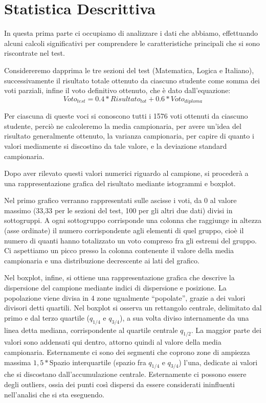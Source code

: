 \section{Statistica Descrittiva}

In questa prima parte ci occupiamo di analizzare i dati che abbiamo, effettuando alcuni calcoli significativi per comprendere le caratteristiche principali che si sono riscontrate nel test.

Considereremo dapprima le tre sezioni del test (Matematica, Logica e Italiano), successivamente il risultato totale ottenuto da ciascuno studente come somma dei voti parziali, infine il voto definitivo ottenuto, che è dato dall’equazione:
\[
Voto_{test} = 0.4 * Risultato_{tot} + 0.6 * Voto_{diploma}
\]

Per ciascuna di queste voci si conoscono tutti i 1576 voti ottenuti da ciascuno
studente, perciò ne calcoleremo la media campionaria, per avere un’idea del
risultato generalmente ottenuto, la varianza campionaria, per capire di quanto i
valori mediamente si discostino da tale valore, e la deviazione standard
campionaria.

Dopo aver rilevato questi valori numerici riguardo al campione, si procederà a una
rappresentazione grafica del risultato mediante istogrammi e boxplot.

Nel primo grafico verranno rappresentati sulle ascisse i voti, da 0 al valore massimo (33,33 per le sezioni del test, 100 per gli altri due dati) divisi in sottogruppi.
A ogni sottogruppo corrisponde una colonna che raggiunge in altezza (asse ordinate) 
  il numero corrispondente agli elementi di quel gruppo, cioè il numero di quanti hanno
 totalizzato un voto compreso fra gli estremi del gruppo.
Ci aspettiamo un picco presso la colonna contenente il valore della media campionaria e una distribuzione decrescente ai lati del grafico.

Nel boxplot, infine, si ottiene una rappresentazione grafica che descrive la dispersione del campione mediante indici di dispersione e posizione. La popolazione viene divisa in 4 zone ugualmente “popolate”, grazie a dei valori divisori detti quartili. Nel boxplot si osserva un rettangolo centrale, delimitato dal primo e dal terzo quartile ($q_{1/4}$ e $q_{3/4}$), a sua volta diviso internamente da una linea detta mediana, corrispondente al quartile centrale $q_{1/2}$. La maggior parte dei valori sono addensati qui dentro, attorno quindi al valore della media campionaria. Esternamente ci sono dei segmenti che coprono zone di ampiezza massima $1,5* $Spazio interquartile (spazio fra $q_{1/4}$ e $q_{3/4}$) l’una, dedicate ai valori che si discostano dall’accumulazione centrale. Esternamente ci possono essere degli outliers, ossia dei punti così dispersi da essere considerati ininfluenti nell’analisi che si sta eseguendo. 

